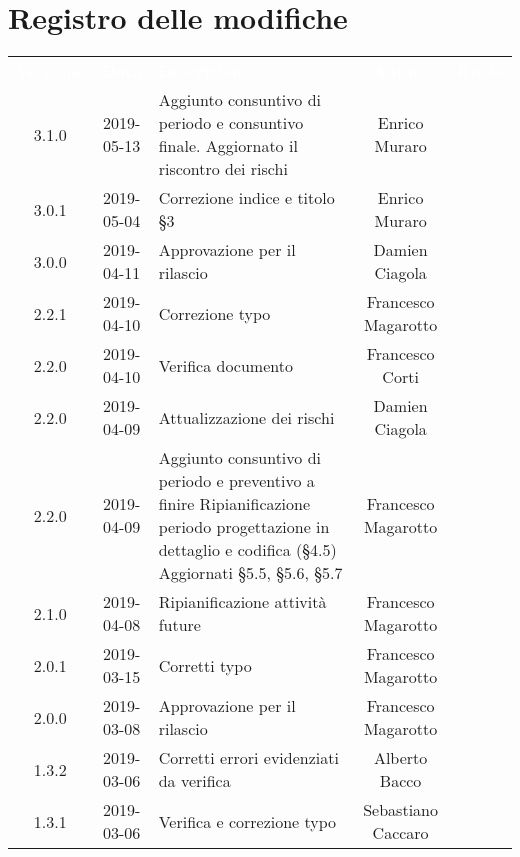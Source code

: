 \section*{Registro delle modifiche}
{
	\renewcommand{\arraystretch}{1.5}
	\centering
	\begin{longtable}{ c c  C{4cm}  c  c }
		
		\textcolor{white}{\textbf{Versione}} & \textcolor{white}{\textbf{Data}} & \textcolor{white}{\textbf{Descrizione}} & \textcolor{white}{\textbf{Autore}} & \textcolor{white}{\textbf{Ruolo}}\\
		
		3.1.0 & 2019-05-13 & Aggiunto consuntivo di periodo e consuntivo finale. Aggiornato il riscontro dei rischi & Enrico Muraro & \reda{}\\
		3.0.1 & 2019-05-04 & Correzione indice e titolo §3 & Enrico Muraro & \reda{}\\
		3.0.0 & 2019-04-11 & Approvazione per il rilascio & Damien Ciagola & \Res{}\\
		2.2.1 & 2019-04-10 & Correzione typo & Francesco Magarotto & \reda{} \\
		2.2.0 & 2019-04-10 & Verifica documento & Francesco Corti & \ver{} \\
		2.2.0 & 2019-04-09 & Attualizzazione dei rischi & Damien Ciagola & \Res{} \\
		
		2.2.0 & 2019-04-09 & Aggiunto consuntivo di periodo e preventivo a finire \newline Ripianificazione periodo progettazione in dettaglio e codifica (§4.5) \newline Aggiornati §5.5, §5.6, §5.7 & Francesco Magarotto & \reda{}\\
		
		2.1.0 & 2019-04-08 & Ripianificazione attività future & Francesco Magarotto & \reda{} \\
		2.0.1 & 2019-03-15 & Corretti typo & Francesco Magarotto & \reda{}\\
		
		
		2.0.0 & 2019-03-08 & Approvazione per il rilascio & Francesco Magarotto & \Res{}\\
		
		1.3.2 & 2019-03-06 & Corretti errori evidenziati da verifica & Alberto Bacco & \reda{}\\
		
		1.3.1 & 2019-03-06 & Verifica e correzione typo & Sebastiano Caccaro & \ver{}\\


\end{longtable}}
